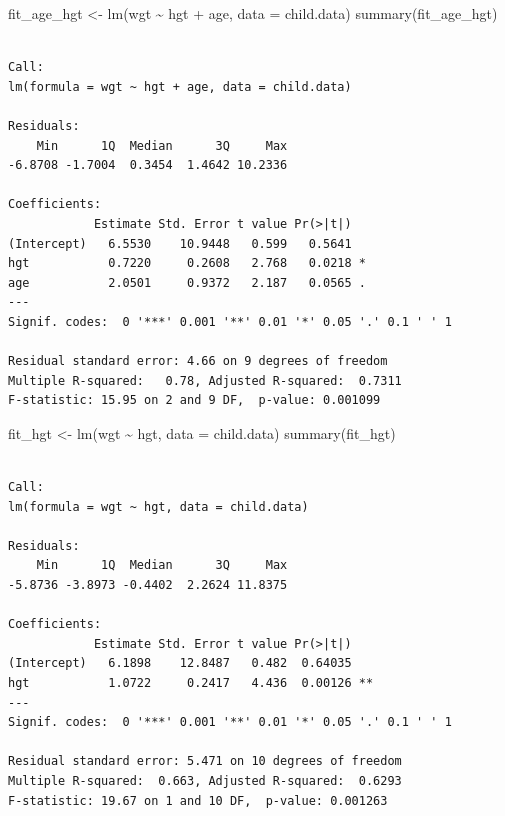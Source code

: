 \documentclass[
  letterpaper,
  DIV=11,
  numbers=noendperiod]{scrreprt}
\newenvironment{Shaded}{\begin{snugshade}}{\end{snugshade}}
\newcommand{\AttributeTok}[1]{\textcolor[rgb]{0.40,0.45,0.13}{#1}}
\newcommand{\FunctionTok}[1]{\textcolor[rgb]{0.28,0.35,0.67}{#1}}
\newcommand{\NormalTok}[1]{\textcolor[rgb]{0.00,0.23,0.31}{#1}}
\newcommand{\OtherTok}[1]{\textcolor[rgb]{0.00,0.23,0.31}{#1}}
\newcommand{\SpecialCharTok}[1]{\textcolor[rgb]{0.37,0.37,0.37}{#1}}
\begin{document}
\begin{Shaded}
\begin{Highlighting}[]
\NormalTok{fit\_age\_hgt }\OtherTok{\textless{}{-}} \FunctionTok{lm}\NormalTok{(wgt }\SpecialCharTok{\textasciitilde{}}\NormalTok{ hgt }\SpecialCharTok{+}\NormalTok{ age, }\AttributeTok{data =}\NormalTok{ child.data)}
\FunctionTok{summary}\NormalTok{(fit\_age\_hgt)}
\end{Highlighting}
\end{Shaded}

\begin{verbatim}

Call:
lm(formula = wgt ~ hgt + age, data = child.data)

Residuals:
    Min      1Q  Median      3Q     Max 
-6.8708 -1.7004  0.3454  1.4642 10.2336 

Coefficients:
            Estimate Std. Error t value Pr(>|t|)  
(Intercept)   6.5530    10.9448   0.599   0.5641  
hgt           0.7220     0.2608   2.768   0.0218 *
age           2.0501     0.9372   2.187   0.0565 .
---
Signif. codes:  0 '***' 0.001 '**' 0.01 '*' 0.05 '.' 0.1 ' ' 1

Residual standard error: 4.66 on 9 degrees of freedom
Multiple R-squared:   0.78, Adjusted R-squared:  0.7311 
F-statistic: 15.95 on 2 and 9 DF,  p-value: 0.001099
\end{verbatim}

\begin{Shaded}
\begin{Highlighting}[]
\NormalTok{fit\_hgt }\OtherTok{\textless{}{-}} \FunctionTok{lm}\NormalTok{(wgt }\SpecialCharTok{\textasciitilde{}}\NormalTok{ hgt, }\AttributeTok{data =}\NormalTok{ child.data)}
\FunctionTok{summary}\NormalTok{(fit\_hgt)}
\end{Highlighting}
\end{Shaded}

\begin{verbatim}

Call:
lm(formula = wgt ~ hgt, data = child.data)

Residuals:
    Min      1Q  Median      3Q     Max 
-5.8736 -3.8973 -0.4402  2.2624 11.8375 

Coefficients:
            Estimate Std. Error t value Pr(>|t|)   
(Intercept)   6.1898    12.8487   0.482  0.64035   
hgt           1.0722     0.2417   4.436  0.00126 **
---
Signif. codes:  0 '***' 0.001 '**' 0.01 '*' 0.05 '.' 0.1 ' ' 1

Residual standard error: 5.471 on 10 degrees of freedom
Multiple R-squared:  0.663, Adjusted R-squared:  0.6293 
F-statistic: 19.67 on 1 and 10 DF,  p-value: 0.001263
\end{verbatim}
\end{document}
